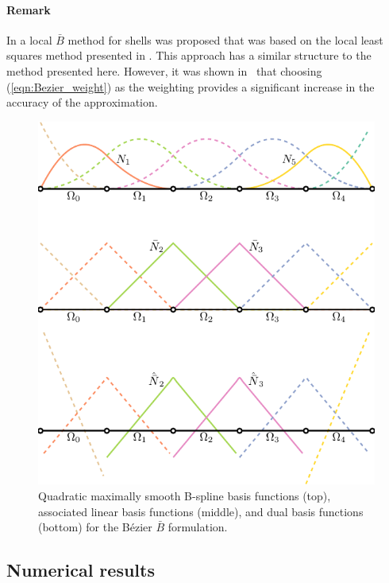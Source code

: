 \documentclass{article}
\begin{document}
\paragraph{Remark} In \cite{bouclier_efficient_2013} a local $\bar{B}$ method for shells was proposed that was based on the local least squares method presented in \cite{govindjee_convergence_2012}. This approach has a similar structure to the  method presented here. However, it was shown in~\cite{thomas_bezier_2015} that choosing (\ref{eqn:Bezier_weight}) as the weighting provides a significant increase in the accuracy of the approximation.

\begin{figure}[htb!]
      \centering
      \includegraphics[width=.5\linewidth]{basis_dual}
\caption{Quadratic maximally smooth B-spline basis functions (top), associated linear basis functions (middle), and dual basis functions (bottom) for the B\'ezier $\bar{B}$ formulation.}
\label{fig:IGAelement}
\end{figure}

\subsection{Numerical results}
\end{document}
